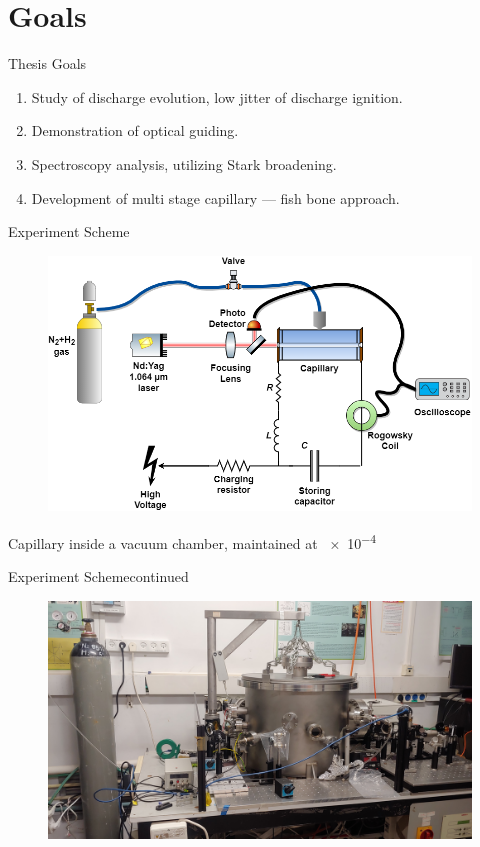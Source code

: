 \documentclass[]{beamer}
\begin{document}
  \section{Goals}
  \begin{frame}{Thesis Goals}
    \begin{enumerate}
      \item Study of discharge evolution, low jitter of discharge ignition.
      \item Demonstration of optical guiding.
      \item Spectroscopy analysis, utilizing Stark broadening.
      \item Development of multi stage capillary --- fish bone approach.
    \end{enumerate}
  \end{frame}
  \begin{frame}{Experiment Scheme}
    \begin{figure}
      \includegraphics[width=\textwidth]{figures/methods/Laser-based ignition scheme.png}
    \end{figure}
    Capillary inside a vacuum chamber, maintained at \SI{e-4}{\torr}
  \end{frame}
  \begin{frame}{Experiment Scheme}{continued}
    \begin{figure}
      \includegraphics[width=\textwidth]{figures/methods/system_picture.jpg}
    \end{figure}
  \end{frame}
\end{document}
